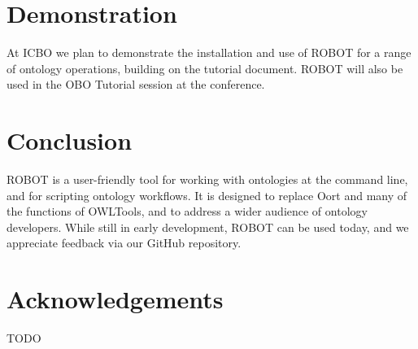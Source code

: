 \documentclass{icbo}
\begin{document}
\section{Demonstration}

At ICBO we plan to demonstrate the installation and use of ROBOT for a range of ontology operations, building on the tutorial document. ROBOT will also be used in the OBO Tutorial session at the conference.


\section{Conclusion}

ROBOT is a user-friendly tool for working with ontologies at the command line, and for scripting ontology workflows. It is designed to replace Oort and many of the functions of OWLTools, and to address a wider audience of ontology developers. While still in early development, ROBOT can be used today, and we appreciate feedback via our GitHub repository.


\section*{Acknowledgements}

TODO






\vspace{80pt}
\end{document}
